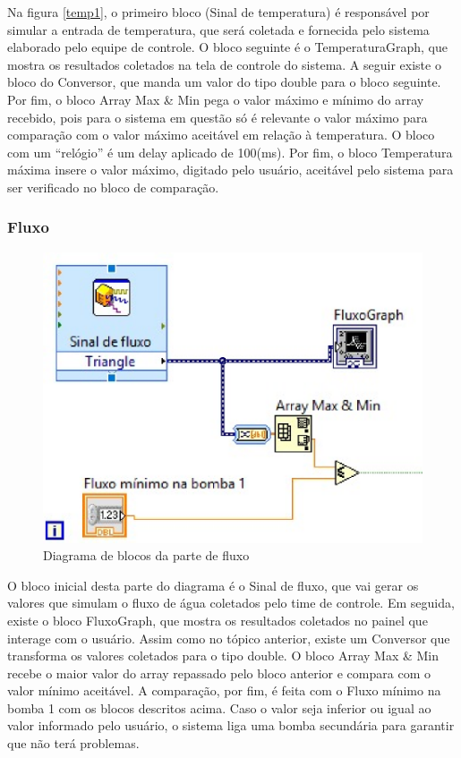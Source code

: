  Na figura \ref{temp1}, o primeiro bloco (Sinal de temperatura) é responsável por simular a entrada de temperatura, que será coletada e fornecida pelo sistema elaborado pelo equipe de controle. O bloco seguinte é o TemperaturaGraph, que mostra os resultados coletados na tela de controle do sistema. A seguir existe o bloco do Conversor, que manda um valor do tipo double para o bloco seguinte. Por fim, o bloco Array Max \& Min pega o valor máximo e mínimo do array recebido, pois para o sistema em questão só é relevante o valor máximo para comparação com o valor máximo aceitável em relação à temperatura.
O bloco com um “relógio” é um delay aplicado de 100(ms). Por fim, o bloco Temperatura máxima insere o valor máximo, digitado pelo usuário, aceitável pelo sistema para ser verificado no bloco de comparação.

\subsubsection{Fluxo}


\begin{figure}[!htb]                                                               
    \centering                                                                      
    \includegraphics[scale=0.6, keepaspectratio=true]{figuras/detalhado/flux.eps} 
    \caption{Diagrama de blocos da parte de fluxo}
 \end{figure}

O bloco inicial desta parte do diagrama é o Sinal de fluxo, que vai gerar os valores que simulam o fluxo de água coletados pelo time de controle. Em seguida, existe o bloco FluxoGraph, que mostra os resultados coletados no painel que interage com o usuário.
    Assim como no tópico anterior, existe um Conversor que transforma os valores coletados para o tipo double. O bloco  Array Max \& Min recebe o maior valor do array repassado pelo bloco anterior e compara com o valor mínimo aceitável.
    A comparação, por fim, é feita com o Fluxo mínimo na bomba 1 com os blocos descritos acima. Caso o valor seja inferior ou igual ao valor informado pelo usuário, o sistema liga uma bomba secundária para garantir que não terá problemas.

